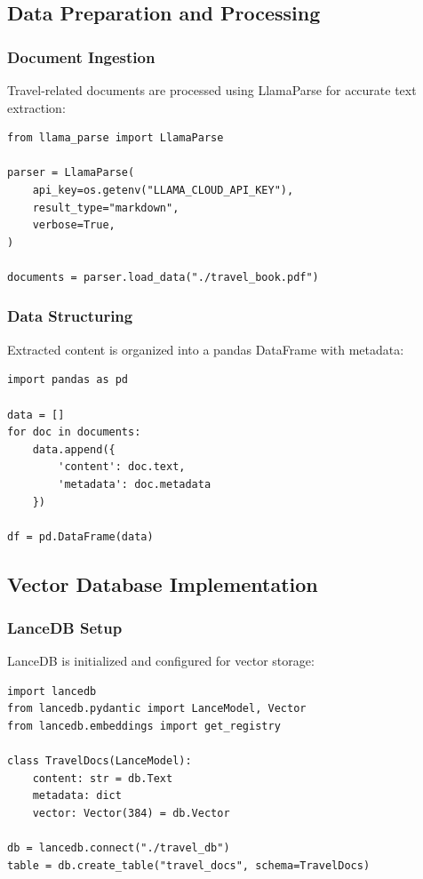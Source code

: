 \documentclass[12pt,a4paper]{article}
\begin{document}
\subsection{Data Preparation and Processing}

\subsubsection{Document Ingestion}
Travel-related documents are processed using LlamaParse for accurate text extraction:

\begin{lstlisting}
from llama_parse import LlamaParse

parser = LlamaParse(
    api_key=os.getenv("LLAMA_CLOUD_API_KEY"),
    result_type="markdown",
    verbose=True,
)

documents = parser.load_data("./travel_book.pdf")
\end{lstlisting}

\subsubsection{Data Structuring}
Extracted content is organized into a pandas DataFrame with metadata:

\begin{lstlisting}
import pandas as pd

data = []
for doc in documents:
    data.append({
        'content': doc.text,
        'metadata': doc.metadata
    })

df = pd.DataFrame(data)
\end{lstlisting}

\subsection{Vector Database Implementation}

\subsubsection{LanceDB Setup}
LanceDB is initialized and configured for vector storage:

\begin{lstlisting}
import lancedb
from lancedb.pydantic import LanceModel, Vector
from lancedb.embeddings import get_registry

class TravelDocs(LanceModel):
    content: str = db.Text
    metadata: dict
    vector: Vector(384) = db.Vector

db = lancedb.connect("./travel_db")
table = db.create_table("travel_docs", schema=TravelDocs)
\end{lstlisting}
\end{document}

